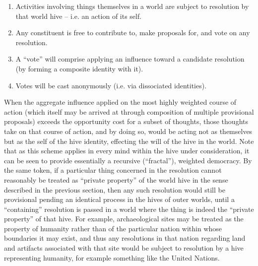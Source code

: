 \documentclass[pra,twocolumn,groupedaddress,10pt]{revtex4}
\theoremstyle{definition}
\begin{document}
\begin{enumerate}
	\item Activities involving things themselves in a world are subject to resolution by that world hive -- i.e. an action of its self.
	\item Any constituent is free to contribute to, make proposals for, and vote on any resolution.
	\item A ``vote'' will comprise applying an influence toward a candidate resolution (by forming a composite identity with it).
	\item Votes will be cast anonymously (i.e. via dissociated identities).
\end{enumerate}

When the aggregate influence applied on the most highly weighted course of action (which itself may be arrived at through composition of multiple provisional proposals) exceeds the opportunity cost for a subset of thoughts, those thoughts take on that course of action, and by doing so, would be acting not as themselves but as the self of the hive identity, effecting the will of the hive in the world. Note that as this scheme applies in every mind within the hive under consideration, it can be seen to provide essentially a recursive (``fractal''), weighted democracy. By the same token, if a particular thing concerned in the resolution cannot reasonably be treated as ``private property'' of the world hive in the sense described in the previous section, then any such resolution would still be provisional pending an identical process in the hives of outer worlds, until a ``containing'' resolution is passed in a world where the thing is indeed the ``private property'' of that hive. For example, archaeological sites may be treated as the property of humanity rather than of the particular nation within whose boundaries it may exist, and thus any resolutions in that nation regarding land and artifacts associated with that site would be subject to resolution by a hive representing humanity, for example something like the United Nations.
\end{document}
